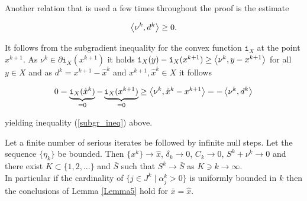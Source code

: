 Another relation that is used a few times throughout the proof is the estimate

\begin{equation}
	\left\langle \nu^k, d^k \right\rangle \geq 0.
\label{subgr_ineq}
\end{equation}

It follows from the subgradient inequality for the convex function \(\mathtt{i}_X\) at the point \(x^{k+1}\). As \(\nu^k \in \partial \mathtt{i}_X(x^{k+1})\) it holds \(\mathtt{i}_X(y)-\mathtt{i}_X(x^{k+1}) \geq \left\langle\nu^k,y-x^{k+1}\right\rangle\) for all \(y \in X\) and as \(d^k = x^{k+1}-\hat{x}^k\) and \(x^{k+1}, \hat{x}^k \in X\) it follows

\[ 0 = \underbrace{\mathtt{i}_X(\hat{x}^k)}_{=0} - \underbrace{\mathtt{i}_X(x^{k+1})}_{=0} \geq \left\langle \nu^k,\hat{x}^k-x^{k+1}\right\rangle = -\left\langle \nu^k,d^k\right\rangle \]

yielding inequality (\ref{subgr_ineq}) above.


\begin{theorem} 
	Let a finite number of serious iterates be followed by infinite null steps. Let the sequence \(\{\eta_k\}\) be bounded.
	Then \(\{x^k\} \to \hat{x}\), \(\delta_k \to 0\), \(C_k \to 0\), \(S^k + \nu^k \to 0\) and there exist \(K\subset \{1,2,...\}\) and \(\bar{S}\) such that \(S^k \to \bar{S}\) as \(K \ni k \to \infty\). \\
	In particular if the cardinality of \(\{j \in J^k\mid \alpha_j^k > 0 \}\) is uniformly bounded in \(k\) then the conclusions of Lemma \ref{Lemma5} hold for \(\bar{x} = \hat{x}\). 
\end{theorem}

